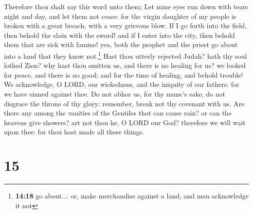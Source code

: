  Therefore thou shalt say this word unto them; Let mine
eyes run down with tears night and day, and let them not cease: for the
virgin daughter of my people is broken with a great breach, with a very
grievous blow.  If I go forth into the field, then behold
the slain with the sword! and if I enter into the city, then behold them
that are sick with famine! yea, both the prophet and the priest go about
into a land that they know not.\footnote{\textbf{14:18} go about\ldots:
  or, make merchandise against a land, and men acknowledge it not}
 Hast thou utterly rejected Judah? hath thy soul lothed
Zion? why hast thou smitten us, and there is no healing for us? we
looked for peace, and there is no good; and for the time of healing, and
behold trouble!  We acknowledge, O LORD, our wickedness,
and the iniquity of our fathers: for we have sinned against thee.
 Do not abhor us, for thy name's sake, do not disgrace
the throne of thy glory: remember, break not thy covenant with us.
 Are there any among the vanities of the Gentiles that
can cause rain? or can the heavens give showers? art not thou he, O LORD
our God? therefore we will wait upon thee: for thou hast made all these
things.

\hypertarget{section-14}{%
\section{15}\label{section-14}}

